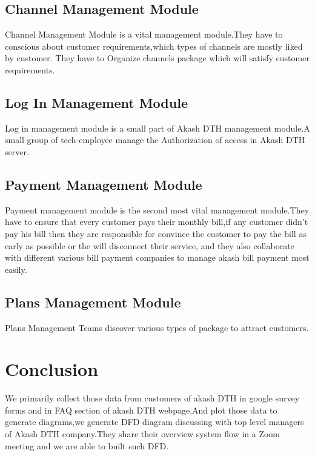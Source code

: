 \begin{spacing}{1}
\subsection{Channel Management Module}
Channel Management Module is a vital management module.They have to conscious about customer requirements,which types of channels are mostly liked by customer. They have to Organize channels package which will satisfy customer requirements.

\subsection{Log In Management Module}
Log in management module is a small part of Akash DTH management module.A small group of tech-employee manage the Authorization of access in Akash DTH server.

\subsection{Payment Management Module}
Payment management module is the second most vital management module.They have to ensure that every customer pays their monthly bill,if any customer didn't pay his bill then they are responsible for convince the customer to pay the bill as early as possible or the will disconnect their service, and they also collaborate with different various bill payment companies to manage akash bill payment most easily.

\subsection{Plans Management Module}
Plans Management Teams discover various types of package to attract customers. 

\section{Conclusion}
We primarily collect those data from customers of akash DTH in google survey forms and in FAQ section of akash DTH webpage.And plot those data to generate diagrams,we generate DFD diagram discussing with top level managers of Akash DTH company.They share their overview system flow in a Zoom meeting and we are able to built such DFD. 

\end{spacing}
